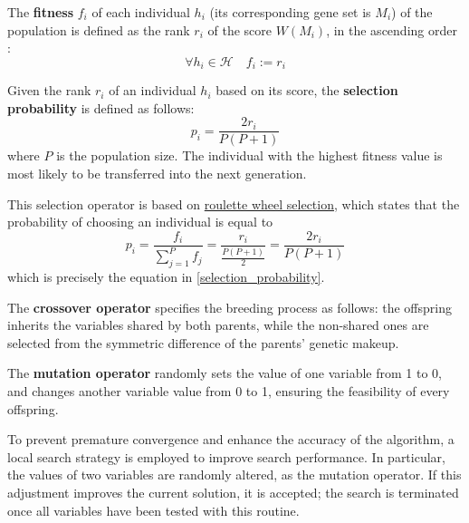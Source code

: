 \begin{definition}
    The \textbf{fitness} $f_i$ of each individual $h_i$ (its corresponding gene set is $M_i$) of the population is defined as the rank $r_i$ of the score $W(M_i)$, in the ascending order : $$\forall h_i \in \mathcal H \quad f_i := r_i$$
\end{definition}

\begin{definition} \label{selection_probability}
    Given the rank $r_i$ of an individual $h_i$ based on its score, the \textbf{selection probability} is defined as follows: $$p_i = \dfrac{2r_i}{P(P + 1)}$$ where $P$ is the population size. The individual with the highest fitness value is most likely to be transferred into the next generation.
\end{definition}

This selection operator is based on \href{https://en.wikipedia.org/wiki/Selection_(genetic_algorithm)#Roulette_wheel_selection}{roulette wheel selection}, which states that the probability of choosing an individual is equal to $$p_i = \dfrac{f_i}{\sum_{j = 1}^P {f_j}} = \dfrac{r_i}{\frac{P(P + 1)}{2}} = \dfrac{2r_i}{P(P+1)}$$ which is precisely the equation in \cref{selection_probability}.

\begin{definition}
    The \textbf{crossover operator} specifies the breeding process as follows: the offspring inherits the variables shared by both parents, while the non-shared ones are selected from the symmetric difference of the parents' genetic makeup.
\end{definition}

\begin{definition}
    The \textbf{mutation operator} randomly sets the value of one variable from 1 to 0, and changes another variable value from 0 to 1, ensuring the feasibility of every offspring.
\end{definition}

\begin{definition} 
    To prevent premature convergence and enhance the accuracy of the algorithm, a local search strategy is employed to improve search performance. In particular, the values of two variables are randomly altered, as the mutation operator. If this adjustment improves the current solution, it is accepted; the search is terminated once all variables have been tested with this routine.
\end{definition}

